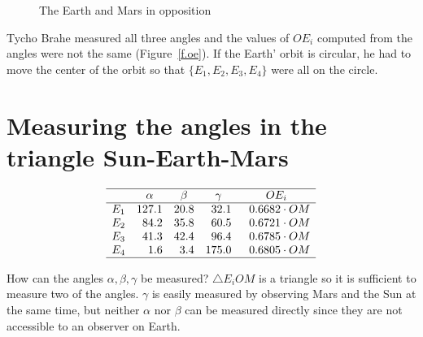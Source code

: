 \begin{figure}[t]
\begin{minipage}{.48\textwidth}
\begin{center}
\caption{The Earth and Mars in opposition\\\mbox{}}\label{f.kepler-opposition}
\end{center}
\end{minipage}
\end{figure}

\newpage

Tycho Brahe measured all three angles and the values of $OE_i$ computed from the angles were not the same (Figure~\ref{f.oe}). If the Earth' orbit is circular, he had to move the center of the orbit so that $\{E_1,E_2,E_3,E_4\}$ were all on the circle.

\section{Measuring the angles in the triangle Sun-Earth-Mars}


\begin{wrapfigure}[6]{R}{.5\textwidth}
\[
\begin{array}{rrrrr}
\hline
& \multicolumn{1}{c}{\alpha} & \multicolumn{1}{c}{\beta} &
  \multicolumn{1}{c}{\gamma} & \multicolumn{1}{c}{OE_i} \\\hline
E_1 & 127.1 & 20.8  & 32.1 & \;\; 0.6682\cdot OM\\
E_2 & 84.2 & 35.8 & 60.5 & \;\;0.6721\cdot OM\\
E_3 & 41.3 & 42.4 &96.4 & \;\;0.6785\cdot OM\\
E_4 & 1.6& 3.4& 175.0 & \;\;0.6805\cdot OM\\
\hline
\end{array}
\]
\end{wrapfigure}

How can the angles $\alpha, \beta, \gamma$ be measured? $\triangle E_iOM$ is a triangle so it is sufficient to measure two of the angles. $\gamma$ is easily measured by observing Mars and the Sun at the same time, but neither $\alpha$ nor $\beta$ can be measured directly since they are not accessible to an observer on Earth.

